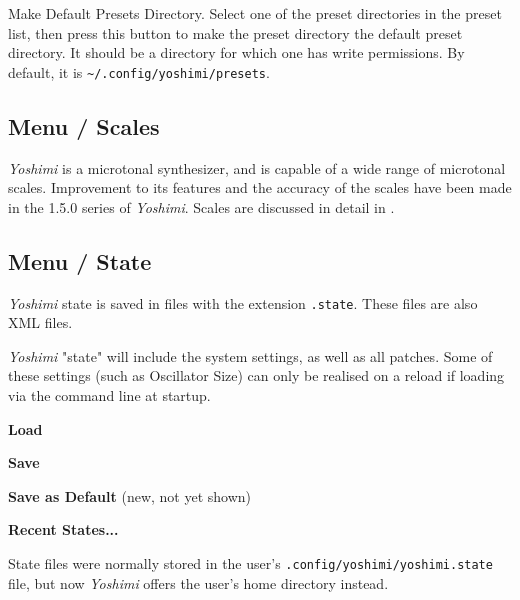    Make Default Presets Directory.
   Select one of the preset directories in the preset list, then press this
   button to make the preset directory the default preset directory.
   It should be a directory for which one has write permissions.
   By default, it is \texttt{\textasciitilde/.config/yoshimi/presets}.

\subsection{Menu / Scales}
\label{subsec:menu_scales}

   \textsl{Yoshimi} is a microtonal synthesizer, and is capable of a wide
   range of microtonal scales.  Improvement to its features and the accuracy of
   the scales have been made in the 1.5.0 series of \textsl{Yoshimi}.
   Scales are discussed in detail in
   .

\subsection{Menu / State}
\label{subsec:menu_state}

   \textsl{Yoshimi} state is saved in files with the extension
   \texttt{.state}.  These files are also XML files.

   \textsl{Yoshimi} "state" will include the system settings, as well as all
   patches. Some of these settings (such as Oscillator Size) can only be
   realised on a reload if loading via the command line at startup.


   \begin{enumber}
      \item \textbf{Load}
      \item \textbf{Save}
      \item \textbf{Save as Default} (new, not yet shown)
      \item \textbf{Recent States...}
   \end{enumber}

   State files were normally stored in the
   user's \texttt{.config/yoshimi/yoshimi.state} file, but
   now \textsl{Yoshimi} offers the user's home directory instead.

